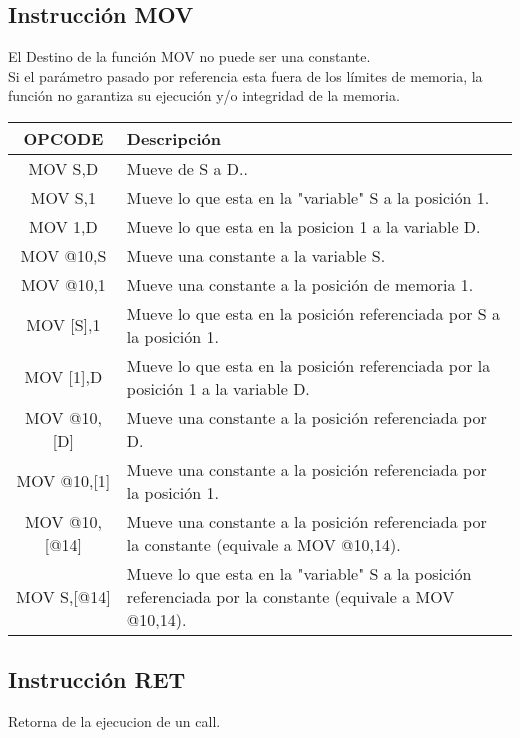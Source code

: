 \documentclass[12pt]{article}
\begin{document}
\subsection{Instrucci\'on MOV}
El Destino de la funci\'on MOV no puede ser una constante.\\
Si el par\'ametro pasado por referencia esta fuera de los l\'imites de memoria, la funci\'on no garantiza su ejecuci\'on y/o integridad de la memoria.\\
\begin{tabular}{| c | p{11.5cm}|}
\hline 
OPCODE & Descripci\'on  \\ \hline
MOV S,D & Mueve de S a D..\\ \hline
MOV S,1  & Mueve lo que esta en la "variable" S a la posici\'on 1.\\ \hline
MOV 1,D  & Mueve lo que esta en la posicion 1 a la variable D.\\ \hline
MOV @10,S  & Mueve una constante a la variable S.\\ \hline
MOV @10,1  & Mueve una constante a la posici\'on de memoria 1.\\ \hline
MOV [S],1  & Mueve lo que esta en la posici\'on referenciada por S a la posici\'on 1.\\ \hline
MOV [1],D  & Mueve lo que esta en la posici\'on referenciada por la posici\'on 1 a la variable D.\\ \hline
MOV @10,[D] & Mueve una constante a la posici\'on referenciada por D.\\ \hline
MOV @10,[1] &Mueve una constante a la posici\'on referenciada por la posici\'on 1.\\ \hline
MOV @10,[@14] & Mueve una constante a la posici\'on referenciada por la constante (equivale a MOV @10,14).\\ \hline
MOV S,[@14]  & Mueve lo que esta en la "variable" S a la posici\'on referenciada por la constante (equivale a MOV @10,14).\\ \hline
\end{tabular}

\subsection{Instrucci\'on RET }
Retorna de la ejecucion de un call.
\end{document}

